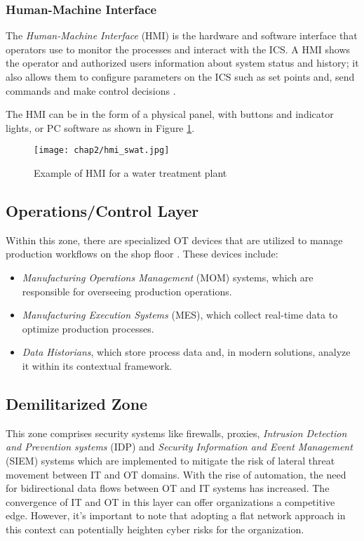 \subsubsection{Human-Machine Interface}
\label{subsubsec:2_hmi}
The \textit{Human-Machine Interface} (HMI) is the hardware and software interface that operators use to monitor the processes and interact with the ICS. A HMI shows the operator and authorized users information about system status and history; it also allows them to configure parameters on the ICS such as set points and, send commands and make control decisions \cite{hmi_definition}.

The HMI can be in the form of a physical panel, with buttons and indicator lights, or PC software as shown in Figure \ref{fig:2_hmi}.

\begin{figure}[ht]
	\centering
	\texttt{[image: chap2/hmi\_swat.jpg]}
	\caption{Example of HMI for a water treatment plant}
	\label{fig:2_hmi}
\end{figure}

\subsection{Operations/Control Layer}
\label{subsec:2_ot_operations_control_layer}
Within this zone, there are specialized OT devices that are utilized to manage production workflows on the shop floor \cite{purdue_layers_1}. These devices include:

\begin{itemize}
	\item \textit{Manufacturing Operations Management} (MOM) systems, which are responsible for overseeing production operations.

	\item \textit{Manufacturing Execution Systems} (MES), which collect real-time data to optimize production processes.

	\item \textit{Data Historians}, which store process data and, in modern solutions, analyze it within its contextual framework.
\end{itemize}

\subsection{Demilitarized Zone}
\label{subsec:2_dmz}
This zone comprises security systems like firewalls, proxies, \textit{Intrusion Detection and Prevention systems} (IDP) and \textit{Security Information and Event Management} (SIEM) systems which are implemented to mitigate the risk of lateral threat movement between IT and OT domains. With the rise of automation, the need for bidirectional data flows between OT and IT systems has increased. The convergence of IT and OT in this layer can offer organizations a competitive edge. However, it's important to note that adopting a flat network approach in this context can potentially heighten cyber risks for the organization.

